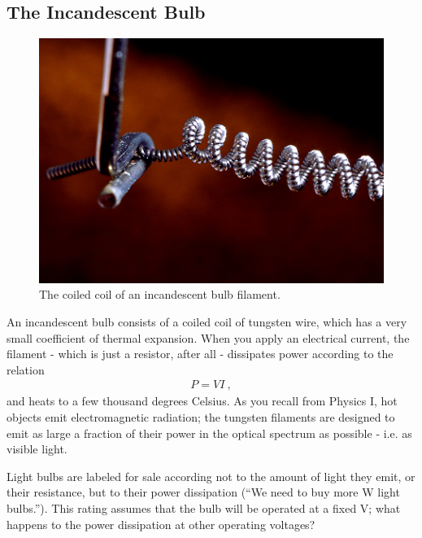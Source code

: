 \documentclass[12pt]{article}
\begin{document}
\subsection{The Incandescent Bulb}
\label{sec:incandescent}

\begin{figure}
  \centering
  \includegraphics[width=2\textwidth/3]{figures/filament}
  \caption{The coiled coil of an incandescent bulb filament.}
  \label{fig:filament}
\end{figure}
An incandescent bulb consists of a coiled coil of tungsten wire, which
has a very small coefficient of thermal expansion.  When you apply an
electrical current, the filament - which is just a resistor, after all
- dissipates power according to the relation
\begin{gather}
  P = VI\ ,
\label{eq:power}
\end{gather}
and heats to a few thousand degrees Celsius.  As you recall from
Physics I, hot objects emit electromagnetic radiation; the tungsten
filaments are designed to emit as large a fraction of their power in
the optical spectrum as possible - i.e. as visible light.

Light bulbs are labeled for sale according not to the amount of light
they emit, or their resistance, but to their power dissipation (``We
need to buy more \unit[60]{W} light bulbs.'').  This rating assumes
that the bulb will be operated at a fixed \unit[120]{V}; what happens
to the power dissipation at other operating voltages?
\end{document}
